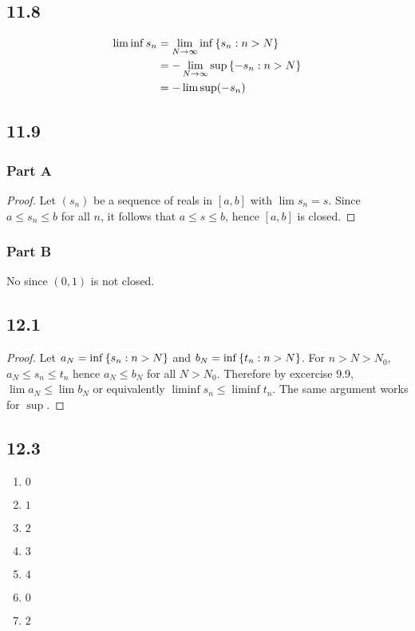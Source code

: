 \documentclass[12pt,titlepage]{extarticle}
\begin{document}
\subsection*{11.8}
\begin{align*}
    \liminf s_n &= \lim_{N \to \infty} \inf \qty{s_n : n > N} \\
    &= -\lim_{N \to \infty} \sup \qty{-s_n : n > N} \\
    &= -\limsup (-s_n)
\end{align*}

\subsection*{11.9}
\subsubsection*{Part A}
\begin{proof}
    Let $(s_n)$ be a sequence of reals in $[a,b]$ with $\lim s_n = s$. Since $a \leq s_n \leq b$ for all $n$, it follows that $a \leq s \leq b$, hence $[a,b]$ is closed.
\end{proof}

\subsubsection*{Part B}
No since $(0,1)$ is not closed.


\subsection*{12.1}
\begin{proof}
    Let $a_N = \inf\qty{s_n : n > N}$ and $b_N = \inf\qty{t_n : n > N}$. For $n > N > N_0$, $a_N \leq s_n \leq t_n$ hence $a_N \leq b_N$ for all $N > N_0$. Therefore by excercise 9.9, $\lim a_N \leq \lim b_N$ or equivalently $\liminf s_n \leq \liminf t_n$. The same argument works for $\sup$.
\end{proof}

\subsection*{12.3}
\begin{enumerate}[label=\alph*)]
    \item $0$
    \item $1$
    \item $2$
    \item $3$
    \item $4$
    \item $0$
    \item $2$
\end{enumerate}
\end{document}
